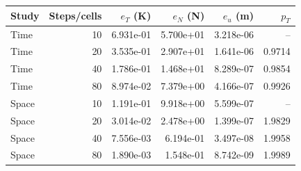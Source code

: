 \begin{center}\small
\begin{tabular}{lrrrrr}\toprule
Study & Steps/cells & $e_T$ (K) & $e_N$ (N) & $e_u$ (m) & $p_T$\\\midrule
Time & 10 & 6.931e-01 & 5.700e+01 & 3.218e-06 & --\\
Time & 20 & 3.535e-01 & 2.907e+01 & 1.641e-06 & 0.9714\\
Time & 40 & 1.786e-01 & 1.468e+01 & 8.289e-07 & 0.9854\\
Time & 80 & 8.974e-02 & 7.379e+00 & 4.166e-07 & 0.9926\\
Space & 10 & 1.191e-01 & 9.918e+00 & 5.599e-07 & --\\
Space & 20 & 3.014e-02 & 2.478e+00 & 1.399e-07 & 1.9829\\
Space & 40 & 7.556e-03 & 6.194e-01 & 3.497e-08 & 1.9958\\
Space & 80 & 1.890e-03 & 1.548e-01 & 8.742e-09 & 1.9989\\
\bottomrule\end{tabular}
\end{center}
